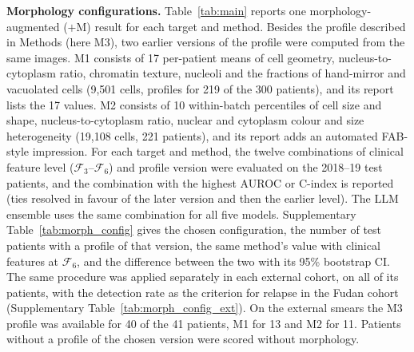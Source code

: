 \documentclass[pdflatex,sn-nature]{sn-jnl}
\begin{document}
\begin{appendices}
\noindent\textbf{Morphology configurations.}
Table~\ref{tab:main} reports one morphology-augmented ($+$M) result
for each target and method.
Besides the profile described in Methods (here M3), two earlier
versions of the profile were computed from the same images.
M1 consists of 17 per-patient means of cell geometry,
nucleus-to-cytoplasm ratio, chromatin texture, nucleoli and the
fractions of hand-mirror and vacuolated cells (9,501 cells, profiles
for 219 of the 300 patients), and its report lists the 17 values.
M2 consists of 10 within-batch percentiles of cell size and shape,
nucleus-to-cytoplasm ratio, nuclear and cytoplasm colour and size
heterogeneity (19,108 cells, 221 patients), and its report adds an
automated FAB-style impression.
For each target and method, the twelve combinations of clinical
feature level ($\mathcal{F}_3$--$\mathcal{F}_6$) and profile version
were evaluated on the 2018--19 test patients, and the combination with
the highest AUROC or C-index is reported (ties resolved in favour of
the later version and then the earlier level). The LLM ensemble uses
the same combination for all five models.
Supplementary Table~\ref{tab:morph_config} gives the chosen
configuration, the number of test patients with a profile of that
version, the same method's value with clinical features at
$\mathcal{F}_6$, and the difference between the two with its 95\%
bootstrap CI.
The same procedure was applied separately in each external cohort, on
all of its patients, with the detection rate as the criterion for
relapse in the Fudan cohort (Supplementary
Table~\ref{tab:morph_config_ext}).
On the external smears the M3 profile was available for 40 of the 41
patients, M1 for 13 and M2 for 11. Patients without a profile of the
chosen version were scored without morphology.


\end{appendices}
\end{document}

